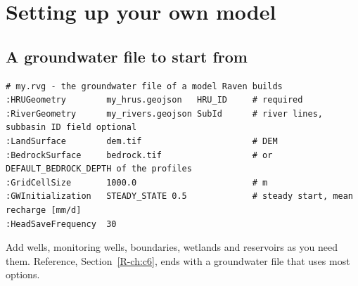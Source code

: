 \section{Setting up your own model}\label{ch:ownmodel}
\subsection{A groundwater file to start from}
\begin{whattowrite}
\small
\begin{lstlisting}
# my.rvg - the groundwater file of a model Raven builds
:HRUGeometry        my_hrus.geojson   HRU_ID     # required
:RiverGeometry      my_rivers.geojson SubId      # river lines, subbasin ID field optional
:LandSurface        dem.tif                      # DEM
:BedrockSurface     bedrock.tif                  # or DEFAULT_BEDROCK_DEPTH of the profiles
:GridCellSize       1000.0                       # m
:GWInitialization   STEADY_STATE 0.5             # steady start, mean recharge [mm/d]
:HeadSaveFrequency  30
\end{lstlisting}
\end{whattowrite}
Add wells, monitoring wells, boundaries, wetlands and reservoirs as you need them. Reference, Section~\ref{R-ch:c6}, ends
with a groundwater file that uses most options.

